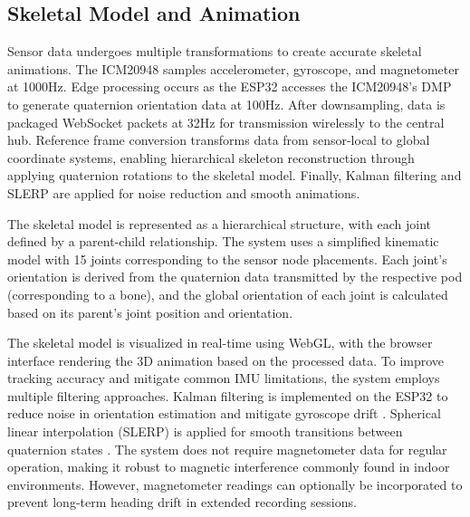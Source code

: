 \documentclass[lettersize,journal]{IEEEtran}
\begin{document}
\subsection{Skeletal Model and Animation}

Sensor data undergoes multiple transformations to create accurate skeletal animations. The ICM20948 samples accelerometer, gyroscope, and magnetometer at 1000Hz. Edge processing occurs as the ESP32 accesses the ICM20948's DMP to generate quaternion orientation data at 100Hz. After downsampling, data is packaged  WebSocket packets at 32Hz for transmission wirelessly to the central hub. Reference frame conversion transforms data from sensor-local to global coordinate systems, enabling hierarchical skeleton reconstruction through applying quaternion rotations to the skeletal model. Finally, Kalman filtering and SLERP are applied for noise reduction and smooth animations.


The skeletal model is represented as a hierarchical structure, with each joint defined by a parent-child relationship. The system uses a simplified kinematic model with 15 joints corresponding to the sensor node placements. Each joint's orientation is derived from the quaternion data transmitted by the respective pod (corresponding to a bone), and the global orientation of each joint is calculated based on its parent's joint position and orientation.

The skeletal model is visualized in real-time using WebGL, with the browser interface rendering the 3D animation based on the processed data. To improve tracking accuracy and mitigate common IMU limitations, the system employs multiple filtering approaches. Kalman filtering is implemented on the ESP32 to reduce noise in orientation estimation and mitigate gyroscope drift \cite{welch2006}.  Spherical linear interpolation (SLERP) is applied for smooth transitions between quaternion states \cite{shoemake1985}. The system does not require magnetometer data for regular operation, making it robust to magnetic interference commonly found in indoor environments. However, magnetometer readings can optionally be incorporated to prevent long-term heading drift in extended recording sessions.
\end{document}
